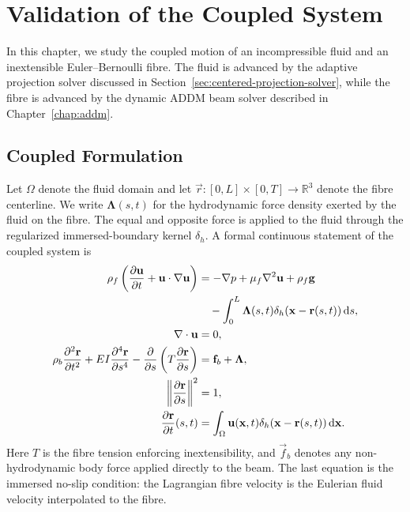\chapter{Validation of the Coupled System}
\label{chap:coupled-validation}

In this chapter, we study the coupled motion of an incompressible fluid and an
inextensible Euler--Bernoulli fibre. The fluid is advanced by the adaptive
projection solver discussed in Section~\ref{sec:centered-projection-solver},
while the fibre is advanced by the dynamic ADDM beam solver described in
Chapter~\ref{chap:addm}.

\section{Coupled Formulation}

Let \(\Omega\) denote the fluid domain and let \(\vec
r:[0,L]\times[0,T]\to\mathbb{R}^3\) denote the fibre centerline. We write
\(\bm\Lambda(s,t)\) for the hydrodynamic force density exerted by the fluid on
the fibre. The equal and opposite force is applied to the fluid through the
regularized immersed-boundary kernel \(\delta_h\). A formal continuous
statement of the coupled system is
\begin{align}
    \rho_f\left(
    \pdv{\vec u}{t}
    + \vec u\cdot\nabla\vec u
    \right)
     & =
    -\nabla p
    + \mu_f\nabla^2\vec u
    + \rho_f\vec g
    \notag                               \\
     & \quad -
    \int_0^L
    \bm\Lambda(s,t)
    \delta_h(\vec x-\vec r(s,t))
    \odif{s},
    \label{eq:coupled-fluid-momentum}    \\
    \nabla\cdot\vec u
     & = 0,
    \label{eq:coupled-incompressibility} \\
    \rho_b\pdv[2]{\vec r}{t}
    + EI\pdv[4]{\vec r}{s}
    - \pdv*{\left(T\pdv{\vec r}{s}\right)}{s}
     & =
    \vec f_b + \bm\Lambda,
    \label{eq:coupled-beam-momentum}     \\
    \norm{\pdv{\vec r}{s}}^2
     & = 1,
    \label{eq:coupled-inextensibility}   \\
    \pdv{\vec r}{t}(s,t)
     & =
    \int_\Omega
    \vec u(\vec x,t)
    \delta_h(\vec x-\vec r(s,t))
    \odif{\vec x}.
    \label{eq:coupled-noslip}
\end{align}
Here \(T\) is the fibre tension enforcing inextensibility, and \(\vec f_b\)
denotes any non-hydrodynamic body force applied directly to the beam. The last
equation is the immersed no-slip condition: the Lagrangian fibre velocity is
the Eulerian fluid velocity interpolated to the fibre.

